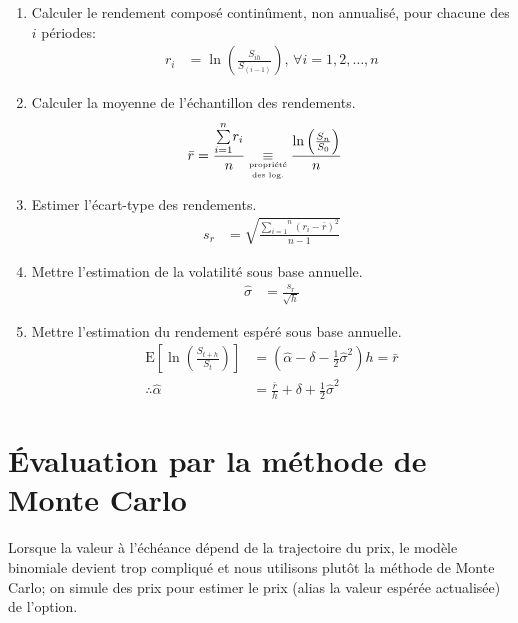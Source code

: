 \documentclass[10pt, french]{article}
\begin{document}
\begin{multicols*}{2}
\begin{definitionNOHFILL}
\begin{enumerate}
	\item	Calculer le rendement composé continûment, non annualisé, pour chacune des $i$ périodes:
		\begin{align*}
		r_{i}
		&=	\ln\left(\frac{S_{ih}}{S_{(i - 1)}}\right), \, \forall i = 1, 2, \dots, n
		\end{align*}
	\item	Calculer la moyenne de l'échantillon des rendements.
		\begin{align*}
		\bar{r}
		&=	\frac{\overset{n}{\underset{i = 1}{\sum}} r_{i}}{n}	
		\underset{\tiny{\shortstack{propriété\\ des log.}}}{\equiv}	\frac{\ln\left(\frac{S_{n}}{S_{0}}\right)}{n}
		\end{align*}
	\item	Estimer l'écart-type des rendements.
		\begin{align*}
		s_{r}
		&=	\sqrt{\frac{\overset{n}{\underset{i = 1}{\sum}} (r_{i} - \bar{r})^{2}}{n - 1}}
		\end{align*}
	\item	Mettre l'estimation de la volatilité sous base annuelle.
		\begin{align*}
		\hat{\sigma}
		&=	\frac{s_{r}}{\sqrt{h}}
		\end{align*}
	\item	Mettre l'estimation du rendement espéré sous base annuelle.
		\begin{align*}
		\text{E}\left[\ln\left(\frac{S_{t + h}}{S_{t}}\right)\right]
		&=
		\left(\hat{\alpha} - \delta - \frac{1}{2} \hat{\sigma}^{2}\right)h	
		=	\bar{r}	\\
		\therefore \hat{\alpha}	&=	\frac{\bar{r}}{h} + \delta + \frac{1}{2} \hat{\sigma}^{2}
		\end{align*}
\end{enumerate}
\end{definitionNOHFILL}

\pagebreak
\section{Évaluation par la méthode de Monte Carlo}
Lorsque la valeur à l'échéance dépend de la trajectoire du prix, le modèle binomiale devient trop compliqué et nous utilisons plutôt la méthode de Monte Carlo; on simule des prix pour estimer le prix (alias la valeur espérée actualisée) de l'option.


\end{multicols*}
\end{document}
